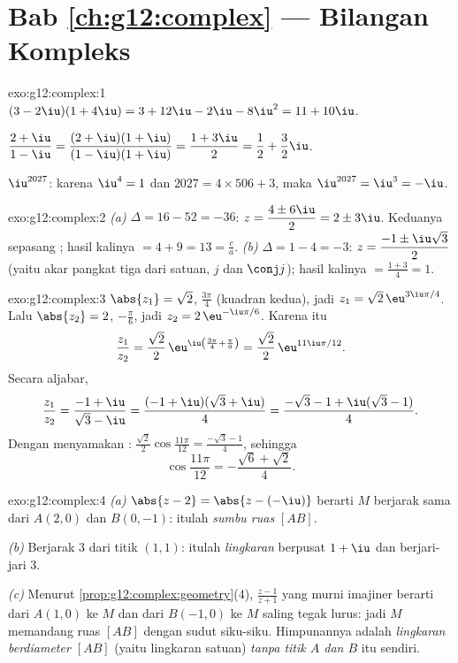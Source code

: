 \section*{Bab \ref{ch:g12:complex} --- Bilangan Kompleks}

\begin{solution}{exo:g12:complex:1}
$(3-2\iu)(1+4\iu) = 3 + 12\iu - 2\iu - 8\iu^2 = 11 + 10\iu$.

$\dfrac{2+\iu}{1-\iu} = \dfrac{(2+\iu)(1+\iu)}{(1-\iu)(1+\iu)}
= \dfrac{1 + 3\iu}{2} = \dfrac12 + \dfrac32\iu$.

$\iu^{2027}$: karena $\iu^4 = 1$ dan $2027 = 4 \times 506 + 3$, maka
$\iu^{2027} = \iu^3 = -\iu$.
\end{solution}

\begin{solution}{exo:g12:complex:2}
\emph{(a)} $\Delta = 16 - 52 = -36$:
$z = \dfrac{4 \pm 6\iu}{2} = 2 \pm 3\iu$. Keduanya sepasang ; hasil kalinya
$= 4 + 9 = 13 = \frac ca$. \emph{(b)} $\Delta = 1 - 4 = -3$:
$z = \dfrac{-1 \pm \iu\sqrt3}{2}$ (yaitu akar pangkat tiga dari satuan, $j$ dan
$\conj j$); hasil kalinya $= \frac{1 + 3}{4} = 1$.
\end{solution}

\begin{solution}{exo:g12:complex:3}
$\abs{z_1} = \sqrt2$,  $\frac{3\pi}{4}$ (kuadran kedua), jadi
$z_1 = \sqrt2\,\eu^{3\iu\pi/4}$.
Lalu $\abs{z_2} = 2$,  $-\frac\pi6$, jadi
$z_2 = 2\,\eu^{-\iu\pi/6}$. Karena itu
\[
\frac{z_1}{z_2} = \frac{\sqrt2}{2}\,\eu^{\iu\left(\frac{3\pi}{4} + \frac{\pi}{6}\right)}
= \frac{\sqrt2}{2}\,\eu^{11\iu\pi/12}.
\]
Secara aljabar,
\[
\frac{z_1}{z_2} = \frac{-1+\iu}{\sqrt3 - \iu}
= \frac{(-1+\iu)(\sqrt3+\iu)}{4}
= \frac{-\sqrt3 - 1 + \iu(\sqrt3 - 1)}{4}.
\]
Dengan menyamakan :
$\frac{\sqrt2}{2}\cos\frac{11\pi}{12} = \frac{-\sqrt3-1}{4}$, sehingga
\[
\cos\frac{11\pi}{12} = -\frac{\sqrt6 + \sqrt2}{4}.
\]
\end{solution}

\begin{solution}{exo:g12:complex:4}
\emph{(a)} $\abs{z - 2} = \abs{z - (-\iu)}$ berarti $M$ berjarak sama dari
$A(2, 0)$ dan $B(0, -1)$: itulah \emph{sumbu ruas} $[AB]$.

\emph{(b)} Berjarak $3$ dari titik $(1,1)$: itulah \emph{lingkaran} berpusat
$1 + \iu$ dan berjari-jari $3$.

\emph{(c)} Menurut \cref{prop:g12:complex:geometry}(4), $\frac{z-1}{z+1}$ yang murni
imajiner berarti  dari $A(1,0)$ ke $M$ dan dari $B(-1,0)$ ke $M$
saling tegak lurus: jadi $M$ memandang ruas $[AB]$ dengan sudut siku-siku. Himpunannya
adalah \emph{lingkaran berdiameter $[AB]$} (yaitu lingkaran satuan) \emph{tanpa
titik $A$ dan $B$} itu sendiri.
\end{solution}

